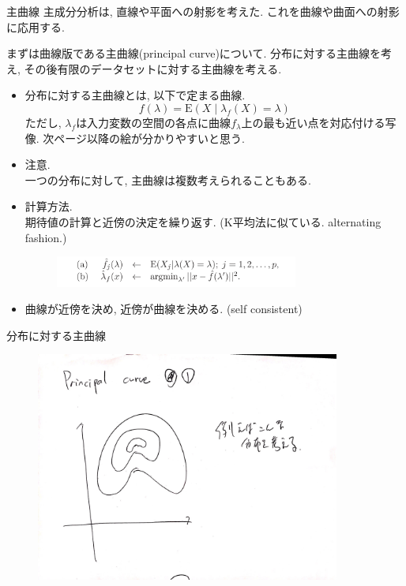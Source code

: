 \documentclass[dvipdfmx,8pt]{beamer}
\begin{document}
  \begin{frame}{主曲線}
    主成分分析は, 直線や平面への射影を考えた. これを曲線や曲面への射影に応用する.

    まずは曲線版である主曲線(principal curve)について.
    分布に対する主曲線を考え, その後有限のデータセットに対する主曲線を考える.

    \begin{itemize}
      \item 分布に対する主曲線とは, 以下で定まる曲線.
      \[
        f(\lambda)=\mathrm{E}(X\mid \lambda_f(X)=\lambda)
      \]
      ただし, $\lambda_f$は入力変数の空間の各点に曲線$f_\lambda$上の最も近い点を対応付ける写像.
      次ページ以降の絵が分かりやすいと思う.
      \item 注意.\\
        一つの分布に対して, 主曲線は複数考えられることもある.
      \item 計算方法.\\
        期待値の計算と近傍の決定を繰り返す. (K平均法に似ている. alternating fashion.)\\
        \begin{figure}
          \centering
          \includegraphics[width=8cm,clip]{images/principal.png}
        \end{figure}
      \item 曲線が近傍を決め, 近傍が曲線を決める. (self consistent)
    \end{itemize}
  \end{frame}
  \begin{frame}{分布に対する主曲線}
    \begin{figure}[htb]
      \centering
      \includegraphics[width=10cm,clip]{images/principal-curve-distribution-1.jpg}
    \end{figure}
  \end{frame}
\end{document}
